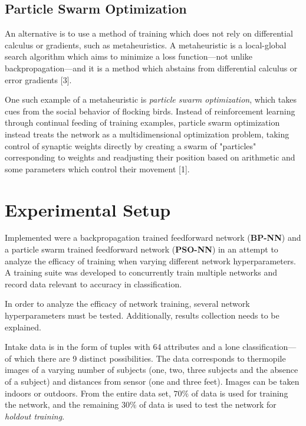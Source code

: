 \documentclass[a4paper,12pt]{article}
\begin{document}
\subsection{Particle Swarm Optimization}

An alternative is to use a method of training which does not rely on differential calculus or gradients, such as metaheuristics. A metaheuristic is a local-global search algorithm which aims to minimize a loss function---not unlike backpropagation---and it is a method which abstains from differential calculus or error gradients [3].

One such example of a metaheuristic is \textit{particle swarm optimization}, which takes cues from the social behavior of flocking birds. Instead of reinforcement learning through continual feeding of training examples, particle swarm optimization instead treats the network as a multidimensional optimization problem, taking control of synaptic weights directly by creating a swarm of "particles" corresponding to weights and readjusting their position based on arithmetic and some parameters which control their movement [1].

\section{Experimental Setup}

Implemented were a backpropagation trained feedforward network (\textbf{BP-NN}) and a particle swarm trained feedforward network (\textbf{PSO-NN}) in an attempt to analyze the efficacy of training when varying different network hyperparameters. A training suite was developed to concurrently train multiple networks and record data relevant to accuracy in classification.

In order to analyze the efficacy of network training, several network hyperparameters must be tested. Additionally, results collection needs to be explained.

Intake data is in the form of tuples with 64 attributes and a lone classification---of which there are 9 distinct possibilities. The data corresponds to thermopile images of a varying number of subjects (one, two, three subjects and the absence of a subject) and distances from sensor (one and three feet). Images can be taken indoors or outdoors. From the entire data set, $70\%$ of data is used for training the network, and the remaining $30\%$ of data is used to test the network for \textit{holdout training}.

\pagebreak
\end{document}
